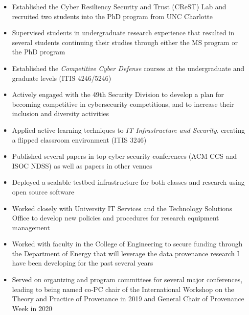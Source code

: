 
\begin{itemize}
\item Established the Cyber Resiliency Security and Trust (CReST) Lab and recruited two students into the PhD program from UNC Charlotte
\item Supervised students in undergraduate research experience that resulted in several students continuing their studies through either the MS program or the PhD program
\item Established the \emph{Competitive Cyber Defense} courses at the undergraduate and graduate levels (ITIS 4246/5246)
\item Actively engaged with the 49th Security Division to develop a plan for becoming competitive in cybersecurity competitions, and to increase their inclusion and diversity activities
\item Applied active learning techniques to \emph{IT Infrastructure and Security}, creating a flipped classroom environment (ITIS 3246)
\item Published several papers in top cyber security conferences (ACM CCS and ISOC NDSS) as well as papers in other venues
\item Deployed a scalable testbed infrastructure for both classes and research using open source software
\item Worked closely with University IT Services and the Technology Solutions Office to develop new policies and procedures for research equipment management
\item Worked with faculty in the College of Engineering to secure funding through the Department of Energy that will leverage the data provenance research I have been developing for the past several years
\item Served on organizing and program committees for several major conferences, leading to being named co-PC chair of the International Workshop on the Theory and Practice of Provenance in 2019 and General Chair of Provenance Week in 2020
\end{itemize}